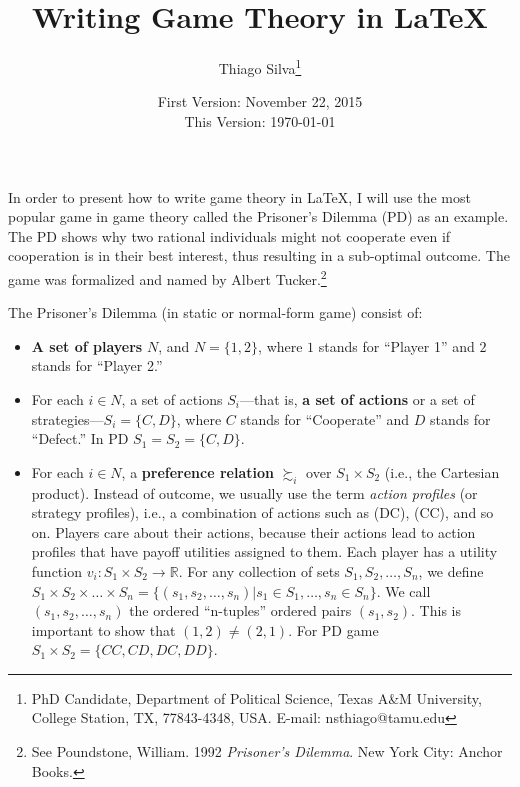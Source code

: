 \documentclass[12pt]{article} %
\title{Writing Game Theory in \LaTeX}
\author{Thiago Silva\thanks{PhD Candidate, Department of Political Science, Texas A\&M University, College Station, TX, 77843-4348, USA. E-mail: nsthiago@tamu.edu}}
\date{First Version: November 22, 2015\\
This Version: \today
}
\begin{document}
 
\maketitle

\thispagestyle{empty} %

\renewcommand\listfigurename{\large{List of Figures and Tables}} %
\listoffigures



\clearpage

\doublespace

%
%

In order to present how to write game theory in \LaTeX, I will use the most popular game in game theory called the Prisoner's Dilemma (PD) as an example. The PD shows why two rational individuals might not cooperate even if cooperation is in their best interest, thus resulting in a sub-optimal outcome. The game was formalized and named by Albert Tucker.\footnote{See Poundstone, William. 1992 \emph{Prisoner's Dilemma}. New York City: Anchor Books.}


%
%


The Prisoner's Dilemma (in static or normal-form game) consist of:
\begin{itemize}
	\item \textbf{A set of players} $N$, and $N = \{1, 2\}$, where $1$ stands for ``Player 1'' and $2$ stands for ``Player 2.''
	\item For each $i \in N$, a set of actions $S_{i}$---that is, \textbf{a set of actions} or {a set of strategies}---$S_{i} = \{C, D\}$, where $C$ stands for ``Cooperate'' and $D$ stands for ``Defect.'' In PD $S_{1} = S_{2} = \{C,D\}$.
	\item For each $i \in N$, a \textbf{preference relation} $\succsim_{i}$ over $S_{1} \times S_{2}$ (i.e., the Cartesian product). Instead of outcome, we usually use the term \emph{action profiles} (or strategy profiles), i.e., a combination of actions such as (DC), (CC), and so on. Players care about their actions, because their actions lead to action profiles that have payoff utilities assigned to them. Each player has a utility function $v_{i}:S_{1}\times S_{2} \rightarrow \mathbb{R}$. For any collection of sets $S_{1}, S_{2}, \dots, S_{n}$, we define $S_{1} \times S_{2} \times \dots \times S_{n} = \{(s_{1}, s_{2}, \dots, s_{n})|s_{1}\in S_{1}, \dots, s_{n}\in S_{n}\}$. We call $(s_{1}, s_{2}, \dots, s_{n})$ the ordered ``n-tuples'' ordered pairs $(s_{1}, s_{2})$. This is important to show that $(1,2) \neq (2,1)$. For PD game $S_{1}\times S_{2} = \{CC, CD, DC, DD\}$. 
	
	\end{itemize}
	
\end{document}
